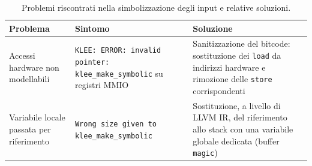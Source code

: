 \begin{table}[H]
                \centering
                \small
                \begin{tabular}{p{3.2cm} p{4.5cm} p{4.8cm}}
                \toprule
                \textbf{Problema} & \textbf{Sintomo} & \textbf{Soluzione} \\
                \midrule
                Accessi hardware non modellabili & 
                \texttt{KLEE: ERROR: invalid pointer: klee\_make\_symbolic} su registri 
                MMIO & 
                Sanitizzazione del bitcode: sostituzione dei \texttt{load} da 
                indirizzi hardware e rimozione delle \texttt{store} corrispondenti \\
                \midrule
                Variabile locale passata per riferimento & 
                \texttt{Wrong size given to klee\_make\_symbolic} & 
                Sostituzione, a livello di LLVM IR, del riferimento allo stack con una 
                variabile globale dedicata (buffer \texttt{magic}) \\
                \bottomrule
                \end{tabular}
                \caption{Problemi riscontrati nella simbolizzazione degli input e relative soluzioni.}
                \label{tab:klee-stub}
            \end{table}